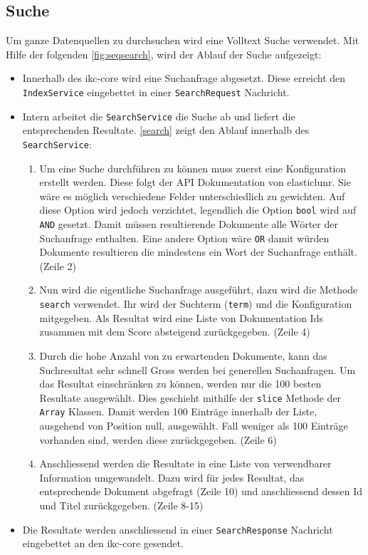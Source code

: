 \subsection{Suche}

Um ganze Datenquellen zu durchsuchen wird eine Volltext Suche verwendet. Mit Hilfe der folgenden \autoref{fig:seqsearch}, wird der Ablauf der Suche aufgezeigt:
\begin{itemize}
    \item Innerhalb des \gls{ikc-core} wird eine Suchanfrage abgesetzt. Diese erreicht den \texttt{IndexService} eingebettet in einer \texttt{SearchRequest} Nachricht. 
    \item Intern arbeitet die \texttt{SearchService} die Suche ab und liefert die entsprechenden Resultate. \autoref{search} zeigt den Ablauf innerhalb des \texttt{SearchService}:
    \begin{enumerate}
        \item Um eine Suche durchführen zu können muss zuerst eine Konfiguration erstellt werden. Diese folgt der API Dokumentation von \gls{elasticlunr}. Sie wäre es möglich verschiedene Felder unterschiedlich zu gewichten. Auf diese Option wird jedoch verzichtet, legendlich die Option \texttt{bool} wird auf \texttt{AND} gesetzt. Damit müssen resultierende Dokumente alle Wörter der Suchanfrage enthalten. Eine andere Option wäre \texttt{OR} damit würden Dokumente resultieren die mindestens ein Wort der Suchanfrage enthält. (Zeile 2)
        \item Nun wird die eigentliche Suchanfrage ausgeführt, dazu wird die Methode \texttt{search} verwendet. Ihr wird der Suchterm (\texttt{term}) und die Konfiguration mitgegeben. Als Resultat wird eine Liste von Dokumentation Ids zusammen mit dem Score absteigend zurückgegeben. (Zeile 4)
        \item Durch die hohe Anzahl von zu erwartenden Dokumente, kann das Suchresultat sehr schnell Gross werden bei generellen Suchanfragen. Um das Resultat einschränken zu können, werden nur die 100 besten Resultate ausgewählt. Dies geschieht mithilfe der \texttt{slice} Methode der \texttt{Array} Klassen. Damit werden 100 Einträge innerhalb der Liste, ausgehend von Position null, ausgewählt. Fall weniger als 100 Einträge vorhanden sind, werden diese zurückgegeben. (Zeile 6)
        \item Anschliessend werden die Resultate in eine Liste von verwendbarer Information umgewandelt. Dazu wird für jedes Resultat, das entsprechende Dokument abgefragt (Zeile 10) und anschliessend dessen Id und Titel zurückgegeben. (Zeile 8-15)
    \end{enumerate}
    \item Die Resultate werden anschliessend in einer \texttt{SearchResponse} Nachricht eingebettet an den \gls{ikc-core} gesendet.
\end{itemize}

